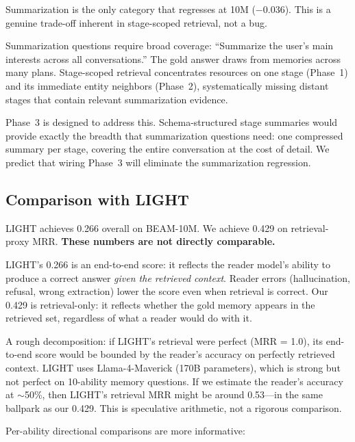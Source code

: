 \documentclass[11pt]{article}
\begin{document}
Summarization is the only category that regresses at 10M ($-0.036$).
This is a genuine trade-off inherent in stage-scoped retrieval, not a
bug.

Summarization questions require broad coverage: ``Summarize the
user's main interests across all conversations.''  The gold answer
draws from memories across many plans.  Stage-scoped retrieval
concentrates resources on one stage (Phase~1) and its immediate
entity neighbors (Phase~2), systematically missing distant stages
that contain relevant summarization evidence.

Phase~3 is designed to address this.  Schema-structured stage
summaries would provide exactly the breadth that summarization
questions need: one compressed summary per stage, covering the entire
conversation at the cost of detail.  We predict that wiring Phase~3
will eliminate the summarization regression.

\subsection{Comparison with LIGHT}
\label{sec:light-comparison}

LIGHT achieves 0.266 overall on BEAM-10M.  We achieve 0.429 on
retrieval-proxy MRR.  \textbf{These numbers are not directly
comparable.}

LIGHT's 0.266 is an end-to-end score: it reflects the reader model's
ability to produce a correct answer \emph{given the retrieved
context}.  Reader errors (hallucination, refusal, wrong extraction)
lower the score even when retrieval is correct.  Our 0.429 is
retrieval-only: it reflects whether the gold memory appears in the
retrieved set, regardless of what a reader would do with it.

A rough decomposition: if LIGHT's retrieval were perfect (MRR = 1.0),
its end-to-end score would be bounded by the reader's accuracy on
perfectly retrieved context.  LIGHT uses Llama-4-Maverick (170B
parameters), which is strong but not perfect on 10-ability memory
questions.  If we estimate the reader's accuracy at $\sim$50\%, then
LIGHT's retrieval MRR might be around 0.53---in the same ballpark as
our 0.429.  This is speculative arithmetic, not a rigorous comparison.

Per-ability directional comparisons are more informative:
\end{document}
